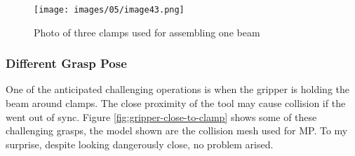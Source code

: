 \begin{figure}
    \centering
    \texttt{[image: images/05/image43.png]}
    \caption{Photo of three clamps used for assembling one beam}
    \label{fig:three-clamps-sync-busstop}
\end{figure}

\subsubsection{Different Grasp Pose}
\label{subsubsection:exploration-2-different-grasp-pose}

One of the anticipated challenging operations is when the gripper is holding the beam around clamps. The close proximity of the tool may cause collision if the  went out of sync. Figure \ref{fig:gripper-close-to-clamp} shows some of these challenging grasps, the model shown are the collision mesh used for MP. To my surprise, despite looking dangerously close, no problem arised.

